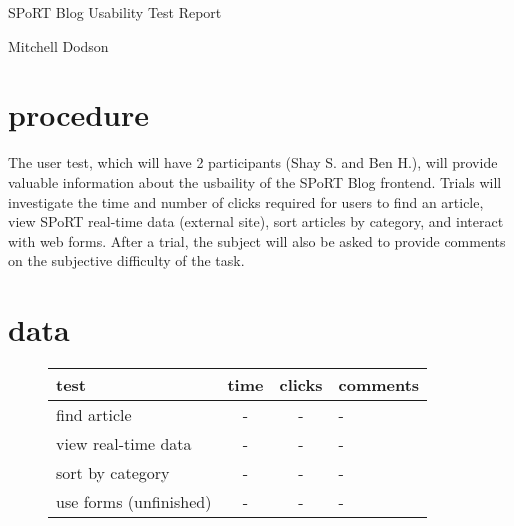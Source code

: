 \documentclass[12pt]{article}
\begin{document}
\vspace*{.5em}
\begin{center}
  {\large SPoRT Blog Usability Test Report}

  Mitchell Dodson
\end{center}
\vspace{.5em}

\section{procedure}

\noindent
The user test, which will have 2 participants (Shay S. and Ben H.), will provide valuable information about the usbaility of the SPoRT Blog frontend. Trials will investigate the time and number of clicks required for users to find an article, view SPoRT real-time data (external site), sort articles by category, and interact with web forms. After a trial, the subject will also be asked to provide comments on the subjective difficulty of the task.

\section{data}

\vspace{2em}
\begin{figure}
  \centering
  \begin{tabular}{l | c c | l }
      test                   & time       & clicks     & comments     \\\hline
      find article           & -          & -          & -            \\
      view real-time data    & -          & -          & -            \\
      sort by category       & -          & -          & -            \\
      use forms (unfinished) & -          & -          & -            \\
  \end{tabular}
\end{figure}



\printbibliography
\end{document}
